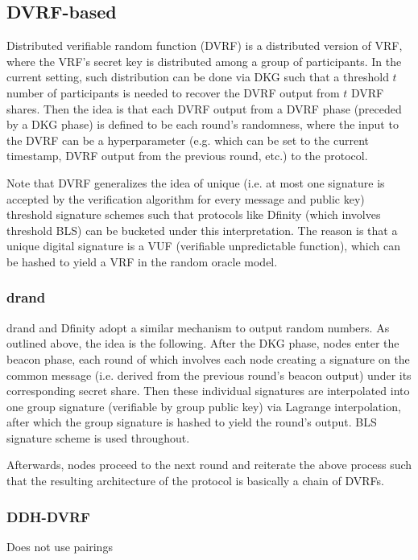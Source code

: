 \documentclass[11pt]{article}
\theoremstyle{definition}
\theoremstyle{remark}
\begin{document}
\subsection{DVRF-based}
Distributed verifiable random function (DVRF) is a distributed version of VRF, where the VRF's secret key is distributed among a group of participants. In the current setting, such distribution can be done via DKG such that a threshold $t$ number of participants is needed to recover the DVRF output from $t$ DVRF shares. Then the idea is that each DVRF output from a DVRF phase (preceded by a DKG phase) is defined to be each round's randomness, where the input to the DVRF can be a hyperparameter (e.g. which can be set to the current timestamp, DVRF output from the previous round, etc.) to the protocol.

Note that DVRF generalizes the idea of unique (i.e. at most one signature is accepted by the verification algorithm for every message and public key) threshold signature schemes such that protocols like Dfinity (which involves threshold BLS) can be bucketed under this interpretation. The reason is that a unique digital signature is a VUF (verifiable unpredictable function), which can be hashed to yield a VRF in the random oracle model.

\subsubsection{drand}
drand and Dfinity adopt a similar mechanism to output random numbers. As outlined above, the idea is the following. After the DKG phase, nodes enter the beacon phase, each round of which involves each node creating a signature on the common message (i.e. derived from the previous round's beacon output) under its corresponding secret share. Then these individual signatures are interpolated into one group signature (verifiable by group public key) via Lagrange interpolation, after which the group signature is hashed to yield the round's output. BLS signature scheme is used throughout.

Afterwards, nodes proceed to the next round and reiterate the above process such that the resulting architecture of the protocol is basically a chain of DVRFs.

\subsubsection{DDH-DVRF}
Does not use pairings
\end{document}
